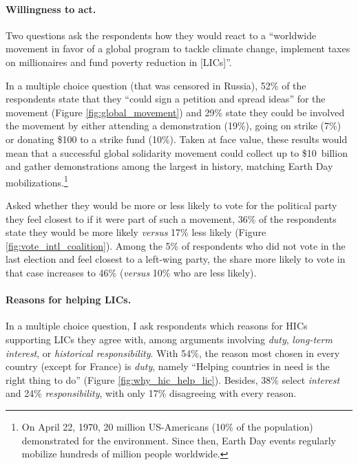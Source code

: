\documentclass[12pt,english]{article}
\begin{document}
\begin{bibunit}
\paragraph{Willingness to act.}

Two questions ask the respondents how they would react to a ``worldwide movement in favor of a global program to tackle climate change, implement taxes on millionaires and fund poverty reduction in [LICs]''. 

In a multiple choice question (that was censored in Russia), 52\% of the respondents state that they ``could sign a petition and spread ideas'' for the movement (Figure \ref{fig:global_movement}) and 29\% state they could be involved the movement by either attending a demonstration (19\%), going on strike (7\%) or donating \$100 to a strike fund (10\%). Taken at face value, these results would mean that a successful global solidarity movement could collect up to \$10~billion and gather demonstrations among the largest in history, matching Earth Day mobilizations.\footnote{On April 22, 1970, 20 million US-Americans (10\% of the population) demonstrated for the environment. Since then, Earth Day events regularly mobilize hundreds of million people worldwide.} 

Asked whether they would be more or less likely to vote for the political party they feel closest to if it were part of such a movement, 36\% of the respondents state they would be more likely \textit{versus} 17\% less likely (Figure \ref{fig:vote_intl_coalition}). Among the 5\% of respondents who did not vote in the last election and feel closest to a left-wing party, the share more likely to vote in that case increases to 46\% (\textit{versus} 10\% who are less likely). 


\paragraph{Reasons for helping LICs.}

In a multiple choice question, I ask respondents which reasons for HICs supporting LICs they agree with, among arguments involving \textit{duty}, \textit{long-term interest}, or \textit{historical responsibility}. With 54\%, the reason most chosen in every country (except for France) is \textit{duty}, namely ``Helping countries in need is the right thing to do'' (Figure \ref{fig:why_hic_help_lic}). Besides, 38\% select \textit{interest} and 24\% \textit{responsibility}, with only 17\% disagreeing with every reason.


\end{bibunit}
\end{document}

